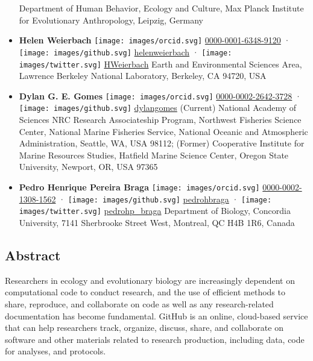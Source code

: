 \begin{itemize}
  Department of Human Behavior, Ecology and Culture, Max Planck Institute for Evolutionary Anthropology, Leipzig, Germany
\item
  \textbf{Helen Weierbach}
  \texttt{[image: images/orcid.svg]}
  \href{https://orcid.org/0000-0001-6348-9120}{0000-0001-6348-9120}
  · \texttt{[image: images/github.svg]}
  \href{https://github.com/helenweierbach}{helenweierbach}
  · \texttt{[image: images/twitter.svg]}
  \href{https://twitter.com/HWeierbach}{HWeierbach}
  Earth and Environmental Sciences Area, Lawrence Berkeley National Laboratory, Berkeley, CA 94720, USA
\item
  \textbf{Dylan G. E. Gomes}
  \texttt{[image: images/orcid.svg]}
  \href{https://orcid.org/0000-0002-2642-3728}{0000-0002-2642-3728}
  · \texttt{[image: images/github.svg]}
  \href{https://github.com/dylangomes}{dylangomes}
  (Current) National Academy of Sciences NRC Research Associateship Program, Northwest Fisheries Science Center, National Marine Fisheries Service, National Oceanic and Atmospheric Administration, Seattle, WA, USA 98112; (Former) Cooperative Institute for Marine Resources Studies, Hatfield Marine Science Center, Oregon State University, Newport, OR, USA 97365
\item
  \textbf{Pedro Henrique Pereira Braga}
  \texttt{[image: images/orcid.svg]}
  \href{https://orcid.org/0000-0002-1308-1562}{0000-0002-1308-1562}
  · \texttt{[image: images/github.svg]}
  \href{https://github.com/pedrohbraga}{pedrohbraga}
  · \texttt{[image: images/twitter.svg]}
  \href{https://twitter.com/pedrohp_braga}{pedrohp\_braga}
  Department of Biology, Concordia University, 7141 Sherbrooke Street West, Montreal, QC H4B 1R6, Canada
\end{itemize}

\hypertarget{abstract}{%
\subsection{Abstract}\label{abstract}}

Researchers in ecology and evolutionary biology are increasingly dependent on computational code to conduct research, and the use of efficient methods to share, reproduce, and collaborate on code as well as any research-related documentation has become fundamental.
GitHub is an online, cloud-based service that can help researchers track, organize, discuss, share, and collaborate on software and other materials related to research production, including data, code for analyses, and protocols.


